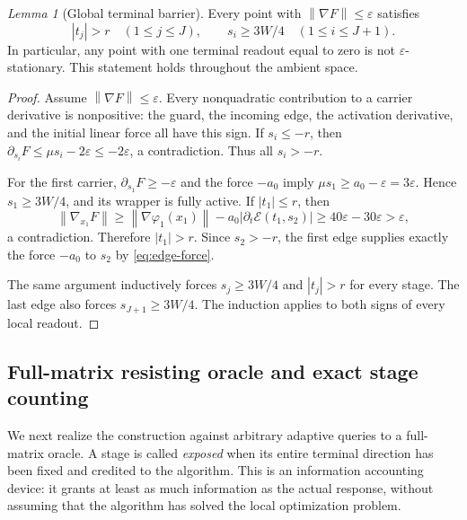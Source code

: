 \documentclass[11pt]{article}
\newtheorem{lemma}[theorem]{Lemma}
\theoremstyle{remark}
\newtheorem{lemma}[lemma]{Lemma}
\theoremstyle{remark}
\newcommand{\eps}{\varepsilon}
\newcommand{\norm}[1]{\left\lVert#1\right\rVert}
\begin{document}
\begin{lemma}[Global terminal barrier]\label{lem:global-barrier}
Every point with $\norm{\nabla F}\le\eps$ satisfies
\begin{equation}\label{eq:every-tail-complete}
 |t_j|>r\quad(1\le j\le J),\qquad
 s_i\ge3W/4\quad(1\le i\le J+1).
\end{equation}
In particular, any point with one terminal readout equal to zero is not $\eps$-stationary. This statement holds throughout the ambient space.
\end{lemma}
\begin{proof}
Assume $\norm{\nabla F}\le\eps$. Every nonquadratic contribution to a carrier derivative is nonpositive: the guard, the incoming edge, the activation derivative, and the initial linear force all have this sign. If $s_i\le-r$, then
$\partial_{s_i}F\le\mu s_i-2\eps\le-2\eps$, a contradiction. Thus all $s_i>-r$.

For the first carrier, $\partial_{s_1}F\ge-\eps$ and the force $-a_0$ imply $\mu s_1\ge a_0-\eps=3\eps$. Hence $s_1\ge3W/4$, and its wrapper is fully active. If $|t_1|\le r$, then
\[
 \norm{\nabla_{x_1}F}
 \ge\norm{\nabla\varphi_1(x_1)}-
 a_0|\partial_t\mathcal E(t_1,s_2)|
 \ge40\eps-30\eps>\eps,
\]
a contradiction. Therefore $|t_1|>r$. Since $s_2>-r$, the first edge supplies exactly the force $-a_0$ to $s_2$ by \eqref{eq:edge-force}.

The same argument inductively forces $s_j\ge3W/4$ and $|t_j|>r$ for every stage. The last edge also forces $s_{J+1}\ge3W/4$. The induction applies to both signs of every local readout.
\end{proof}

\subsection{Full-matrix resisting oracle and exact stage counting}
\label{sec:matrix-counting}
We next realize the construction against arbitrary adaptive queries to a full-matrix oracle. A stage is called \emph{exposed} when its entire terminal direction has been fixed and credited to the algorithm. This is an information accounting device: it grants at least as much information as the actual response, without assuming that the algorithm has solved the local optimization problem.
\end{document}
